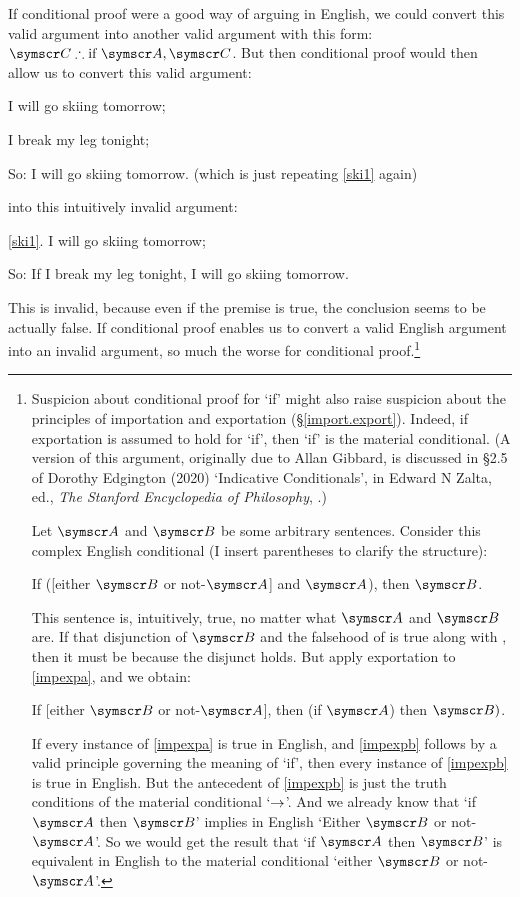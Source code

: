 If conditional proof were a good way of arguing in English, we could convert this valid argument into another valid argument with this form: $\meta{C} \ttherefore \text{if }\meta{A}, \meta{C}$. But then conditional proof would then allow us to convert this valid argument: \begin{earg}
	\item[\ex{ski1}] I will go skiing tomorrow;
	\item[\ex{ski2}] I break my leg tonight;
	\item[So:] I will go skiing tomorrow. \qquad(which is just repeating \ref{ski1} again)
\end{earg} into this intuitively invalid argument:
\begin{earg}
	\item[\ref{ski1}.] I will go skiing tomorrow;
	\item[So:] If I break my leg tonight, I will go skiing tomorrow.
\end{earg} This is invalid, because even if the premise is true, the conclusion seems to be actually false. If conditional proof enables us to convert a valid English argument into an invalid argument, so much the worse for conditional proof.\footnote{Suspicion about conditional proof for `if' might also raise suspicion about the principles of importation and exportation (§\ref{import.export}). Indeed, if exportation is assumed to hold for `if', then `if' is the material conditional. (A version of this argument, originally due to Allan Gibbard, is discussed in §2.5 of Dorothy Edgington (2020) `Indicative Conditionals', in Edward N Zalta, ed., \emph{The Stanford Encyclopedia of Philosophy}, .)

 Let $\meta{A}$ and $\meta{B}$ be some arbitrary sentences. Consider this complex English conditional (I insert parentheses to clarify the structure): 
\begin{earg}
	\item[\ex{impexpa}] If ([either $\meta{B}$ or not-$\meta{A}$] and $\meta{A}$), then $\meta{B}$. 
\end{earg}
This sentence is, intuitively, true, no matter what $\meta{A}$ and $\meta{B}$ are. If that disjunction of $\meta{B}$ and the falsehood of  is true along with , then it must be because the disjunct  holds. But apply exportation to \ref{impexpa}, and we obtain:
\begin{earg}
	\item[\ex{impexpb}] If [either $\meta{B}$ or not-$\meta{A}$], then (if $\meta{A}$) then $\meta{B})$. 
\end{earg} If every instance of \ref{impexpa} is true in English, and \ref{impexpb} follows by a valid principle governing the meaning of `if', then every instance of \ref{impexpb} is true in English. But the antecedent of \ref{impexpb} is just the truth conditions of the material conditional `$\rightarrow$'. And we already know that `if $\meta{A}$ then $\meta{B}$' implies in English `Either $\meta{B}$ or not-$\meta{A}$'. So we would get the result that `if $\meta{A}$ then $\meta{B}$' is equivalent in English to the material conditional `either $\meta{B}$ or not-$\meta{A}$'.}

